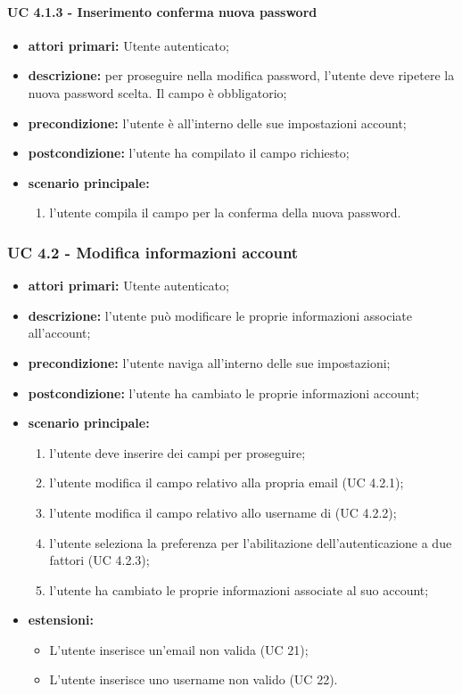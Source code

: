				\paragraph{UC 4.1.3 - Inserimento conferma nuova password}
				\begin{itemize}
					\item \textbf{attori primari:} Utente autenticato;
					\item \textbf{descrizione:} per proseguire nella modifica password, l'utente deve ripetere la nuova password scelta. Il campo è obbligatorio;
					\item \textbf{precondizione:} l'utente è all'interno delle sue impostazioni account;
					\item \textbf{postcondizione:} l'utente ha compilato il campo richiesto;
					\item \textbf{scenario principale:}
					\begin{enumerate}
						\item l'utente compila il campo per la conferma della nuova password.
					\end{enumerate}
				\end{itemize}

			\subsubsection{UC 4.2 - Modifica informazioni account}
			\begin{itemize}
				\item \textbf{attori primari:} Utente autenticato;
				\item \textbf{descrizione:} l'utente può modificare le proprie informazioni associate all'account;
				\item \textbf{precondizione:} l'utente naviga all'interno delle sue impostazioni;
				\item \textbf{postcondizione:} l'utente ha cambiato le proprie informazioni account;
				\item \textbf{scenario principale:}
				\begin{enumerate}
					\item l'utente deve inserire dei campi per proseguire;
					\item l'utente modifica il campo relativo alla propria email (UC 4.2.1);
					\item l'utente modifica il campo relativo allo username di  (UC 4.2.2);
					\item l'utente seleziona la preferenza per l'abilitazione dell'autenticazione a due fattori (UC 4.2.3);
					\item l'utente ha cambiato le proprie informazioni associate al suo account;
				\end{enumerate}	
				\item \textbf{estensioni:}
					\begin{itemize}
						\item L'utente inserisce un'email non valida (UC 21);
						\item L'utente inserisce uno username  non valido (UC 22).
					\end{itemize}
			\end{itemize}

